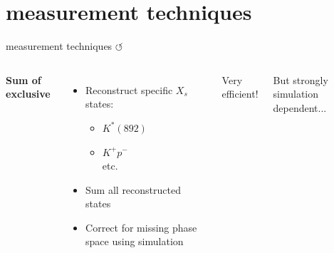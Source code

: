 \documentclass[xcolor=dvipsnames]{beamer}
\begin{document}
\section{\safeBtoXsgamma measurement techniques}


\begin{frame}{\safeBtoXsgamma measurement techniques \hyperlink{frame:A}{$\circlearrowleft$}}
   \scriptsize
   \begin{columns}
      \centering
      
      \centering
      \textbf{Sum of exclusive}
      \begin{itemize}
         \item Reconstruct specific $X_s$ states:
         \begin{itemize}
            \scriptsize
            \item $K^*(892)$
            \item $K^+p^-$\\
            etc.
         \end{itemize} 
         \item Sum all reconstructed states
         \item Correct for missing phase space using simulation
      \end{itemize}

      Very efficient!

      But strongly simulation dependent...


   \end{columns}



\end{frame}
\end{document}
